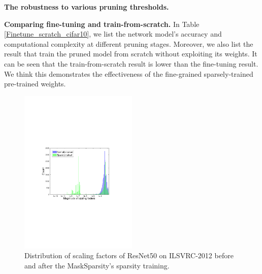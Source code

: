\documentclass[review]{cvpr}
\begin{document}
\textbf{The robustness to various pruning thresholds.} 


\textbf{Comparing fine-tuning and train-from-scratch.} 
In Table \ref{Finetune_scratch_cifar10}, we list the network model's accuracy and computational complexity at different pruning stages. Moreover, we also list the result that train the pruned model from scratch without exploiting its weights. It can be seen that the train-from-scratch result is lower than the fine-tuning result. We think this demonstrates the effectiveness of the fine-grained sparsely-trained pre-trained weights.


 \begin{figure}[h!]
\begin{centering}
	\includegraphics[width=0.5\textwidth]{figure/solve_pbm_cropped.pdf} 
	\caption{Distribution of scaling factors of ResNet50 on ILSVRC-2012 before and after the MaskSparsity's sparsity training.}
	\label{dstbtion-mask-sp}
	\par\end{centering}
\end{figure}
\end{document}
